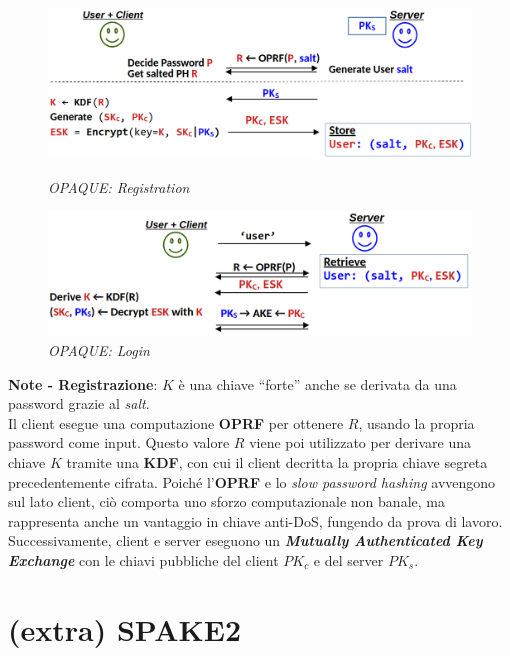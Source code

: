 \begin{flushleft}
    \begin{figure}[h]
        \centering
        \begin{minipage}[t]{0.85\textwidth}
            \centering
            \includegraphics[width=\textwidth]{img/opaque_registration.png}
            \caption{\textit{OPAQUE: Registration}}
        \end{minipage}
        \hfill
        \begin{minipage}[t]{0.85\textwidth}
            \centering
            \includegraphics[width=\textwidth]{img/opaque_login.png}
            \caption{\textit{OPAQUE: Login}}
        \end{minipage}
    \end{figure}

    \textbf{Note - Registrazione}: $K$ è una chiave ``forte'' anche se derivata da una password grazie al \textit{salt}. \\
    Il client esegue una computazione \textbf{OPRF} per ottenere $R$, usando la propria password come input. Questo valore $R$ viene poi utilizzato per derivare una chiave $K$ tramite una \textbf{KDF}, con cui il client decritta la propria chiave segreta precedentemente cifrata. Poiché l'\textbf{OPRF} e lo \textit{slow password hashing} avvengono sul lato client, ciò comporta uno sforzo computazionale non banale, ma rappresenta anche un vantaggio in chiave anti-DoS, fungendo da prova di lavoro. Successivamente, client e server eseguono un \textbf{\textit{Mutually Authenticated Key Exchange}} con le chiavi pubbliche del client $PK_c$ e del server $PK_s$.

\end{flushleft}

\section{(extra) SPAKE2}